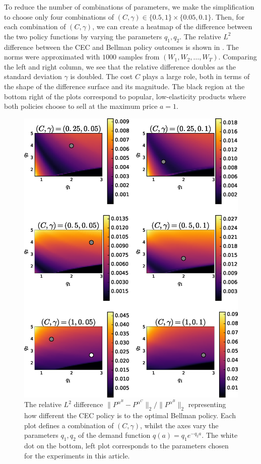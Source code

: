 \documentclass[main.tex]{subfiles}
\begin{document}
To reduce the number of combinations of parameters, we make the
simplification to choose only
four combinations of
$(C,\gamma)\in\{0.5,1\}\times\{0.05,0.1\}$.
Then,
for each combination of $(C,\gamma)$,
we can create a heatmap of the difference between the two policy
functions by varying the parameters $q_1,q_2$.
The relative $L^2$ difference between the CEC and Bellman policy outcomes
is shown in . The norms were approximated
with $1000$ samples from $(W_1,W_2,\dots,W_T)$.
Comparing the left and right column, we see that the relative difference doubles as
the standard deviation $\gamma$ is doubled. The cost $C$ plays a large
role, both in terms of the shape of the difference surface and its
magnitude.
The black region at the bottom right of the plots correspond to popular,
low-elasticity products where both policies choose to sell at the
maximum price $a=1$.
\begin{figure}[htbp]
  \includegraphics[width=\textwidth]{./img/profit_diff_heatmaps}
  \caption{The relative $L^2$ difference
    $\|P^{\alpha^B}-P^{\alpha^C}\|_2/\|P^{\alpha^B}\|_2$ representing
    how different the CEC policy is to the optimal Bellman policy.
    Each plot defines a combination of $(C,\gamma)$, whilst
    the axes vary the parameters $q_1,q_2$ of the demand function
    $q(a)=q_1e^{-q_2a}$.
    The white dot on the bottom, left plot corresponds to the
    parameters chosen for the experiments in this article.
  }\label{fig:profit_diff_heatmaps}
\end{figure}
\end{document}
